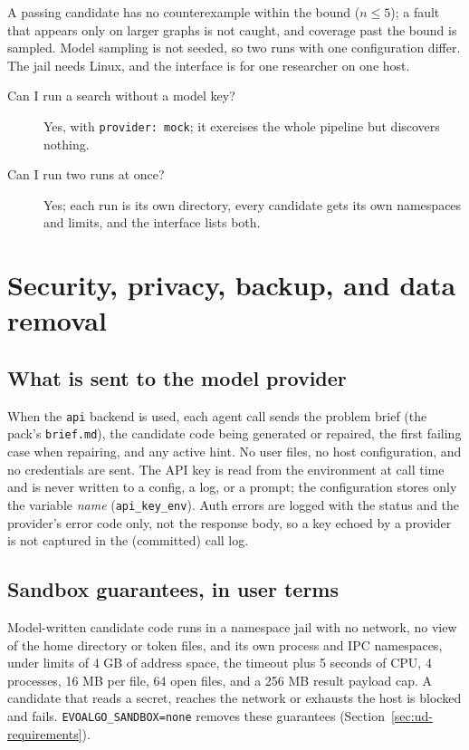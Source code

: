 A passing candidate has no counterexample within the bound ($n \le 5$); a fault
that appears only on larger graphs is not caught, and coverage past the bound is
sampled. Model sampling is not seeded, so two runs with one configuration differ.
The jail needs Linux, and the interface is for one researcher on one host.

\begin{description}
   \item[Can I run a search without a model key?] Yes, with
   \texttt{provider: mock}; it exercises the whole pipeline but discovers
   nothing.
   \item[Can I run two runs at once?] Yes; each run is its own directory, every
   candidate gets its own namespaces and limits, and the interface lists both.
\end{description}

\section{Security, privacy, backup, and data removal}
\label{sec:ud-security}

\subsection{What is sent to the model provider}

When the \texttt{api} backend is used, each agent call sends the problem brief
(the pack's \texttt{brief.md}), the candidate code being generated or repaired,
the first failing case when repairing, and any active hint. No user files, no
host configuration, and no credentials are sent. The API key is read from the
environment at call time and is never written to a config, a log, or a
prompt; the configuration stores only the variable \emph{name}
(\texttt{api\_key\_env}). Auth errors are logged with the status and the
provider's error code only, not the response body, so a key echoed by a
provider is not captured in the (committed) call log.

\subsection{Sandbox guarantees, in user terms}

Model-written candidate code runs in a namespace jail with no network, no view of
the home directory or token files, and its own process and IPC namespaces, under
limits of 4 GB of address space, the timeout plus 5 seconds of CPU, 4 processes,
16 MB per file, 64 open files, and a 256 MB result payload cap. A candidate that reads a
secret, reaches the network or exhausts the host is blocked and fails.
\texttt{EVOALGO\_SANDBOX=none} removes these guarantees
(Section~\ref{sec:ud-requirements}).

